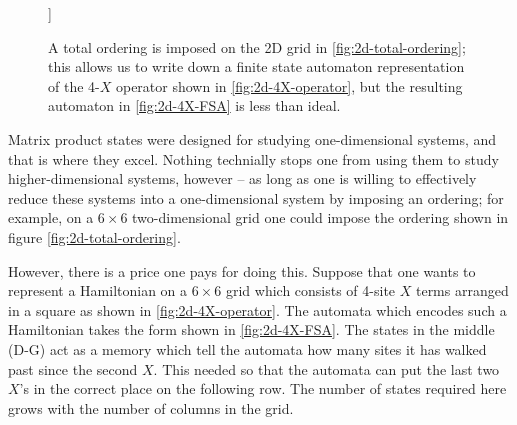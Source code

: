 \documentclass{amsbook}
\theoremstyle{plain}
\theoremstyle{definition}
\theoremstyle{remark}
\begin{document}
\begin{figure}
]{}
\caption{A total ordering is imposed on the 2D grid in \ref{fig:2d-total-ordering};  this allows us to write down a finite state automaton representation of the 4-$X$ operator shown in \ref{fig:2d-4X-operator}, but the resulting automaton in \ref{fig:2d-4X-FSA} is less than ideal.}
\end{figure}

Matrix product states were designed for studying one-dimensional systems, and that is where they excel.  Nothing technially stops one from using them to study higher-dimensional systems, however -- as long as one is willing to effectively reduce these systems into a one-dimensional system by imposing an ordering; for example, on a $6\times 6$ two-dimensional grid one could impose the ordering shown in figure \ref{fig:2d-total-ordering}.

However, there is a price one pays for doing this.  Suppose that one wants to represent a Hamiltonian on a $6\times 6$ grid which consists of 4-site $X$ terms arranged in a square as shown in \ref{fig:2d-4X-operator}. The automata which encodes such a Hamiltonian takes the form shown in \ref{fig:2d-4X-FSA}.  The states in the middle (D-G) act as a memory which tell the automata how many sites it has walked past since the second $X$.  This needed so that the automata can put the last two $X$'s in the correct place on the following row.  The number of states required here grows with the number of columns in the grid.
\end{document}
